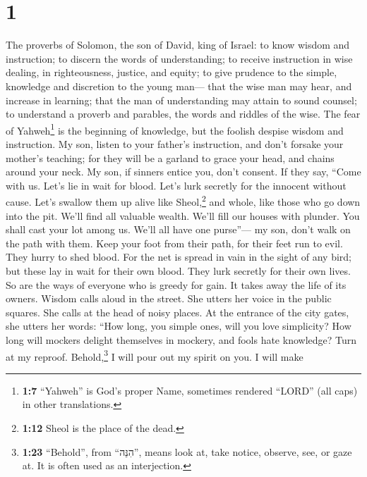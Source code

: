 \hypertarget{section}{%
\section{1}\label{section}}

 The proverbs of Solomon, the son of David, king of
Israel:  to know wisdom and instruction; to discern the
words of understanding;  to receive instruction in wise
dealing, in righteousness, justice, and equity;  to give
prudence to the simple, knowledge and discretion to the young man---
 that the wise man may hear, and increase in learning;
that the man of understanding may attain to sound counsel;
 to understand a proverb and parables, the words and
riddles of the wise.  The fear of Yahweh\footnote{\textbf{1:7}
  ``Yahweh'' is God's proper Name, sometimes rendered ``LORD'' (all
  caps) in other translations.} is the beginning of knowledge, but the
foolish despise wisdom and instruction.  My son, listen to
your father's instruction, and don't forsake your mother's teaching;
 for they will be a garland to grace your head, and chains
around your neck.  My son, if sinners entice you, don't
consent.  If they say, ``Come with us. Let's lie in wait
for blood. Let's lurk secretly for the innocent without cause.
 Let's swallow them up alive like Sheol,\footnote{\textbf{1:12}
  Sheol is the place of the dead.} and whole, like those who go down
into the pit.  We'll find all valuable wealth. We'll fill
our houses with plunder.  You shall cast your lot among
us. We'll all have one purse''---  my son, don't walk on
the path with them. Keep your foot from their path,  for
their feet run to evil. They hurry to shed blood.  For
the net is spread in vain in the sight of any bird;  but
these lay in wait for their own blood. They lurk secretly for their own
lives.  So are the ways of everyone who is greedy for
gain. It takes away the life of its owners.  Wisdom calls
aloud in the street. She utters her voice in the public squares.
 She calls at the head of noisy places. At the entrance
of the city gates, she utters her words:  ``How long, you
simple ones, will you love simplicity? How long will mockers delight
themselves in mockery, and fools hate knowledge?  Turn at
my reproof. Behold,\footnote{\textbf{1:23} ``Behold'', from ``הִנֵּה'',
  means look at, take notice, observe, see, or gaze at. It is often used
  as an interjection.} I will pour out my spirit on you. I will make
